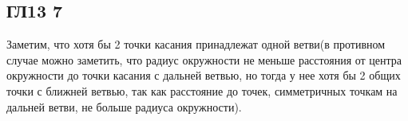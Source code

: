 \subsection*{ГЛ13 7}
Заметим, что хотя бы 2 точки касания принадлежат одной ветви(в противном случае можно заметить, что радиус окружности не меньше расстояния от центра окружности до точки касания с дальней ветвью, но тогда у нее хотя бы 2 общих точки с ближней ветвью, так как расстояние до точек, симметричных точкам на дальней ветви, не больше радиуса окружности).
		